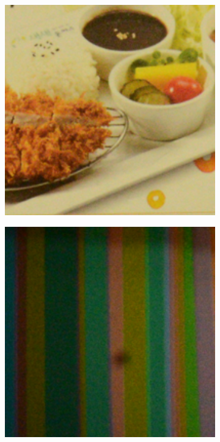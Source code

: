 \begin{figure}
\begin{subfigure}[t]{0.19\textwidth}
    \end{subfigure}
\hfill
    \begin{subfigure}[t]{0.19\textwidth}
        \centering
        \includegraphics[width=1\textwidth]{images/mcwnnm/resize_d800_iso3200_2_real.png}
    \end{subfigure}
    \hfill
    \begin{subfigure}[t]{0.19\textwidth}
        \centering
        \includegraphics[width=1\textwidth]{images/mcwnnm/resize_d800_iso3200_3_real.png}

\end{subfigure}
\end{figure}
